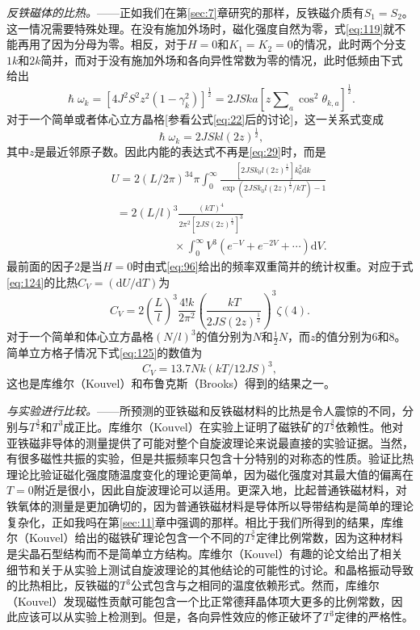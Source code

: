 \documentclass{article}
\begin{document}
\textit{反铁磁体的比热。}——正如我们在第\ref{sec:7}章研究的那样，反铁磁介质有$S_1=S_2$。这一情况需要特殊处理。在没有施加外场时，磁化强度自然为零，式\eqref{eq:119}就不能再用了因为分母为零。相反，对于$H=0$和$K_1=K_2=0$的情况，此时两个分支$1k$和$2k$简并，而对于没有施加外场和各向异性常数为零的情况，此时低频由下式给出
\begin{equation} \label{eq:122}
\hslash\omega_k=[4J^2S^2z^2(1-\gamma_k^2)]^\frac{1}{2}=2JSka[z\sum\nolimits_a\cos^2\theta_{k,a}]^\frac{1}{2}.
\end{equation}
对于一个简单或者体心立方晶格[参看公式\eqref{eq:22}后的讨论]，这一关系式变成
\begin{equation} \label{eq:123}
\hslash\omega_k=2JSkl(2z)^\frac{1}{2},
\end{equation}
其中$z$是最近邻原子数。因此内能的表达式不再是\eqref{eq:29}时，而是
\begin{eqnarray} \label{eq:124}
&&U=2(L/2\pi)^34\pi\int_0^\infty\frac{[2JSk_0l(2z)^\frac{1}{2}]k_0^2\mathrm{d}k}{\exp(2JSk_0l(2z)^\frac{1}{2}/kT)-1}\nonumber\\
&&~~=2(L/l)^3\frac{(kT)^4}{2\pi^2[2JS(2z)^\frac{1}{2}]^3}\\
&&~~~~~~~~~~~~~~~~~~~~~~~~~\times\int_0^\infty V^3(e^{-V}+e^{-2V}+\cdots)\mathrm{d}V.\nonumber
\end{eqnarray}
最前面的因子$2$是当$H=0$时由式\eqref{eq:96}给出的频率双重简并的统计权重。对应于式\eqref{eq:124}的比热$C_V=(\mathrm{d}U/\mathrm{d}T)$为
\begin{equation} \label{eq:125}
C_V=2\left(\frac{L}{l}\right)^3\frac{4!k}{2\pi^2}\left(\frac{kT}{2JS(2z)^\frac{1}{2}}\right)^3\zeta(4).
\end{equation}
对于一个简单和体心立方晶格$(N/l)^3$的值分别为$N$和$\tfrac{1}{2}N$，而$z$的值分别为$6$和$8$。简单立方格子情况下式\eqref{eq:125}的数值为
\begin{equation} \label{eq:126}
C_V=13.7Nk(kT/12JS)^3,
\end{equation}
这也是库维尔（Kouvel）和布鲁克斯（Brooks）得到的结果之一。

\textit{与实验进行比较。}——所预测的亚铁磁和反铁磁材料的比热是令人震惊的不同，分别与$T^\frac{3}{2}$和$T^3$成正比。库维尔（Kouvel）在实验上证明了磁铁矿的$T^\frac{3}{2}$依赖性。他对亚铁磁非导体的测量提供了可能对整个自旋波理论来说最直接的实验证据。当然，有很多磁性共振的实验，但是共振频率只包含十分特别的对称态的性质。验证比热理论比验证磁化强度随温度变化的理论更简单，因为磁化强度对其最大值的偏离在$T=0$附近是很小，因此自旋波理论可以适用。更深入地，比起普通铁磁材料，对铁氧体的测量是更加确切的，因为普通铁磁材料是导体所以导带结构是简单的理论复杂化，正如我吗在第\ref{sec:11}章中强调的那样。相比于我们所得到的结果，库维尔（Kouvel）给出的磁铁矿理论包含一个不同的$T^\frac{3}{2}$定律比例常数，因为这种材料是尖晶石型结构而不是简单立方结构。库维尔（Kouvel）有趣的论文给出了相关细节和关于从实验上测试自旋波理论的其他结论的可能性的讨论。和晶格振动导致的比热相比，反铁磁的$T^3$公式包含与之相同的温度依赖形式。然而，库维尔（Kouvel）发现磁性贡献可能包含一个比正常德拜晶体项大更多的比例常数，因此应该可以从实验上检测到。但是，各向异性效应的修正破坏了$T^3$定律的严格性。
\end{document}
